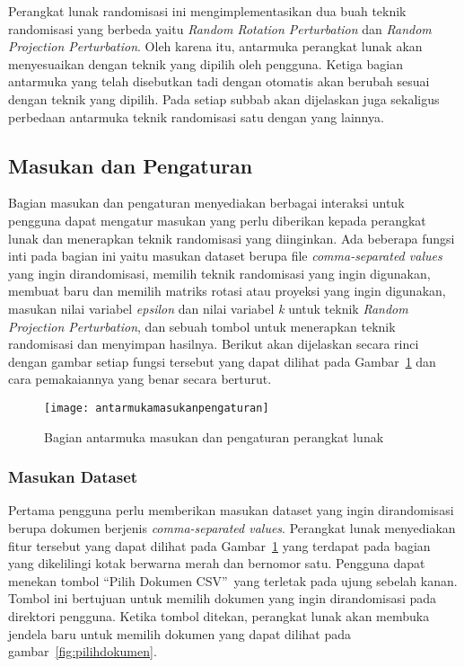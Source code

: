Perangkat lunak randomisasi ini mengimplementasikan dua buah teknik randomisasi yang berbeda yaitu \textit{Random Rotation Perturbation} dan \textit{Random Projection Perturbation}. Oleh karena itu, antarmuka perangkat lunak akan menyesuaikan dengan teknik yang dipilih oleh pengguna. Ketiga bagian antarmuka yang telah disebutkan tadi dengan otomatis akan berubah sesuai dengan teknik yang dipilih. Pada setiap subbab akan dijelaskan juga sekaligus perbedaan antarmuka teknik randomisasi satu dengan yang lainnya.

\subsection{Masukan dan Pengaturan}
\label{subsec:masukanpengaturan}

Bagian masukan dan pengaturan menyediakan berbagai interaksi untuk pengguna dapat mengatur masukan yang perlu diberikan kepada perangkat lunak dan menerapkan teknik randomisasi yang diinginkan. Ada beberapa fungsi inti pada bagian ini yaitu masukan dataset berupa file \textit{comma-separated values} yang ingin dirandomisasi, memilih teknik randomisasi yang ingin digunakan, membuat baru dan memilih matriks rotasi atau proyeksi yang ingin digunakan, masukan nilai variabel \textit{epsilon} dan nilai variabel \textit{k} untuk teknik \textit{Random Projection Perturbation}, dan sebuah tombol untuk menerapkan teknik randomisasi dan menyimpan hasilnya. Berikut akan dijelaskan secara rinci dengan gambar setiap fungsi tersebut yang dapat dilihat pada Gambar~\ref{fig:antarmukamasukanpengaturan} dan cara pemakaiannya yang benar secara berturut. 

\begin{figure}
	\centering
	\texttt{[image: antarmukamasukanpengaturan]}
	\caption{Bagian antarmuka masukan dan pengaturan perangkat lunak}
	\label{fig:antarmukamasukanpengaturan}
\end{figure}

\subsubsection{Masukan Dataset}
\label{subsubsec:masukandataset}

Pertama pengguna perlu memberikan masukan dataset yang ingin dirandomisasi berupa dokumen berjenis \textit{comma-separated values}. Perangkat lunak menyediakan fitur tersebut yang dapat dilihat pada Gambar~\ref{fig:antarmukamasukanpengaturan} yang terdapat pada bagian yang dikelilingi kotak berwarna merah dan bernomor satu. Pengguna dapat menekan tombol \textquotedblleft Pilih Dokumen CSV\textquotedblright~yang terletak pada ujung sebelah kanan. Tombol ini bertujuan untuk memilih dokumen yang ingin dirandomisasi pada direktori pengguna. Ketika tombol ditekan, perangkat lunak akan membuka jendela baru untuk memilih dokumen yang dapat dilihat pada gambar~\ref{fig:pilihdokumen}.

